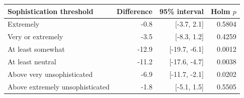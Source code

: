 \begin{tabular}{lrrr}
\toprule
Sophistication threshold & Difference & 95\% interval & Holm $p$ \\
\midrule
Extremely & -0.8 & [-3.7, 2.1] & 0.5804 \\
Very or extremely & -3.5 & [-8.3, 1.2] & 0.4259 \\
At least somewhat & -12.9 & [-19.7, -6.1] & 0.0012 \\
At least neutral & -11.2 & [-17.6, -4.7] & 0.0038 \\
Above very unsophisticated & -6.9 & [-11.7, -2.1] & 0.0202 \\
Above extremely unsophisticated & -1.8 & [-5.1, 1.5] & 0.5505 \\
\bottomrule
\end{tabular}
